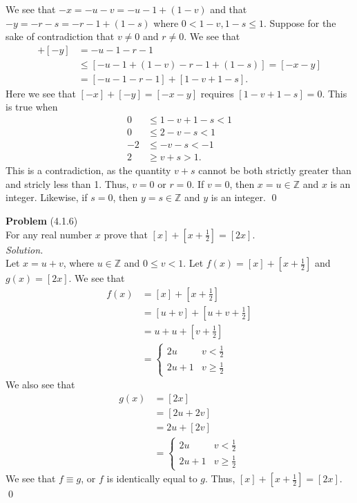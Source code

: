 \documentclass[12 pt]{amsart}
\begin{document}
  We see that $-x = -u - v = -u - 1 + (1 - v)$
  and that $-y = -r - s = -r - 1 + (1 - s)$
  where $0 < 1-v, 1-s \leq 1$.
  Suppose for the sake of contradiction that 
  $v \neq 0$ and $r \neq 0$.
  We see that 
  \begin{align*}
  [-x] + [-y] &= -u - 1 - r - 1 \\
              &\leq [-u - 1 + (1 - v) - r - 1 + (1 - s)] = [-x - y]\\
              &= [-u -1 - r - 1] + [1 - v + 1 - s].
  \end{align*}
  Here we see that $[-x] + [-y] = [-x - y]$ requires $[1 - v + 1 - s] = 0$.
  This is true when
  \begin{align*}
    0 &\leq 1 - v + 1 - s < 1 \\
    0 &\leq 2 - v - s < 1 \\
    -2 &\leq -v - s < -1 \\
    2 &\geq v + s > 1.
  \end{align*}
  This is a contradiction, as the quantity $v+s$ cannot be both
  strictly greater than and stricly less than 1.
  Thus, $v = 0$ or $r = 0$. 
  If $v = 0$, then $x = u \in \mathbb{Z}$ and $x$ is an integer.
  Likewise, if $s = 0$, then $y = s \in \mathbb{Z}$ and $y$ is an integer.
  \qed
\vfill
\newpage



\phantom{\quad} \vfill
\noindent
\textbf{Problem} (4.1.6) \\[4ex]
  For any real number $x$ prove that 
  $[x] + \left[x + \frac{1}{2} \right] = [2x]$.
  \\[2ex]
\emph{Solution.} \\[2ex]
  Let $x = u + v$, where $u \in \mathbb{Z}$ and $0 \leq v < 1$.
  Let $f(x) = [x] + \left[x + \frac{1}{2}\right]$ and $g(x) = [2x]$.
  We see that 
  \begin{align*}
    f(x) &=  [x] + \left[x + \frac{1}{2}\right] \\
         &=  [u + v] + \left[u + v + \frac{1}{2}\right] \\
         &=  u + u + \left[ v + \frac{1}{2}\right] \\
         &= \begin{cases} 2u & v < \frac{1}{2} \\
                          2u + 1 & v \geq \frac{1}{2} 
            \end{cases}
  \end{align*}
  We also see that 
  \begin{align*}
    g(x) &=  [2x]\\ 
         &= [2u + 2v] \\
         &= 2u + [2v] \\
         &= \begin{cases} 2u & v < \frac{1}{2} \\
                          2u + 1 & v \geq \frac{1}{2} 
            \end{cases}
  \end{align*}
  We see that $f \equiv g$, or $f$ is identically equal to $g$.
  Thus, 
  $[x] + \left[x + \frac{1}{2} \right] = [2x]$.
  \qed
\vfill
\newpage
\end{document}
